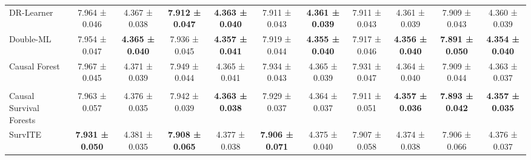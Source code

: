 \documentclass{article} %
\begin{document}
\begin{table}[!ht]
\begin{adjustbox}{angle=90,max height=0.95\textheight,center}
\begin{minipage}{\textheight}
\begin{subtable}{\linewidth}
\begin{tabular}{l cc cc cc cc cc}
        DR-Learner & 7.964 ± 0.046 & 4.367 ± 0.038 & \textbf{7.912 ± 0.047} & \textbf{4.363 ± 0.040} & 7.911 ± 0.043 & \textbf{4.361 ± 0.039} & 7.911 ± 0.043 & 4.361 ± 0.039 & 7.909 ± 0.043 & 4.360 ± 0.039 \\
        Double-ML & 7.954 ± 0.047 & \textbf{4.365 ± 0.040} & 7.936 ± 0.045 & \textbf{4.357 ± 0.041} & 7.919 ± 0.044 & \textbf{4.355 ± 0.040} & 7.917 ± 0.046 & \textbf{4.356 ± 0.040} & \textbf{7.891 ± 0.050} & \textbf{4.354 ± 0.040} \\
        Causal Forest & 7.967 ± 0.045 & 4.371 ± 0.039 & 7.949 ± 0.044 & 4.365 ± 0.041 & 7.934 ± 0.043 & 4.365 ± 0.039 & 7.931 ± 0.047 & 4.364 ± 0.040 & 7.909 ± 0.044 & 4.363 ± 0.037 \\ 
        \addlinespace
        \multicolumn{9}{l}{\textit{Direct-Survival CATE Methods}} \\
        Causal Survival Forests & 7.963 ± 0.057 & 4.376 ± 0.035 & 7.942 ± 0.039 & \textbf{4.363 ± 0.038} & 7.929 ± 0.037 & 4.364 ± 0.037 & 7.911 ± 0.051 & \textbf{4.357 ± 0.036} & \textbf{7.893 ± 0.042} & \textbf{4.357 ± 0.035} \\
        SurvITE & \textbf{7.931 ± 0.050} & 4.381 ± 0.035 & \textbf{7.908 ± 0.065} & 4.377 ± 0.038 & \textbf{7.906 ± 0.071} & 4.375 ± 0.040 & 7.907 ± 0.058 & 4.374 ± 0.038 & 7.906 ± 0.066 & 4.376 ± 0.037 \\


\end{tabular}
\end{subtable}
\end{minipage}
\end{adjustbox}
\end{table}
\end{document}
